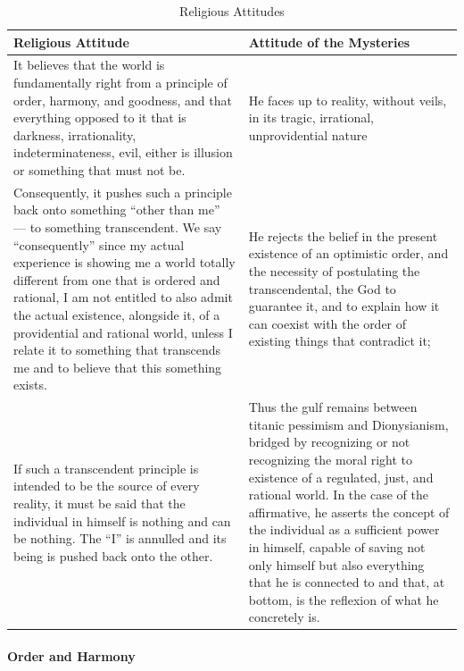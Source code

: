 \begin{table}[h]\small\centering
\begin{tabular}{p{}p{}}\toprule
Religious Attitude & Attitude of the Mysteries \\\midrule

It believes that the world is fundamentally right from a principle of order, harmony, and goodness, and that everything opposed to it that is darkness, irrationality, indeterminateness, evil, either is illusion or something that must not be. & He faces up to reality, without veils, in its tragic, irrational, unprovidential nature \\\midrule

Consequently, it pushes such a principle back onto something ``other than me'' --- to something transcendent. We say ``consequently'' since my actual experience is showing me a world totally different from one that is ordered and rational, I am not entitled to also admit the actual existence, alongside it, of a providential and rational world, unless I relate it to something that transcends me and to believe that this something exists. & He rejects the belief in the present existence of an optimistic order, and the necessity of postulating the transcendental, the God to guarantee it, and to explain how it can coexist with the order of existing things that contradict it; \\\midrule 

If such a transcendent principle is intended to be the source of every reality, it must be said that the individual in himself is nothing and can be nothing. The ``I'' is annulled and its being is pushed back onto the other. & Thus the gulf remains between titanic pessimism and Dionysianism, bridged by recognizing or not recognizing the moral right to existence of a regulated, just, and rational world. In the case of the affirmative, he asserts the concept of the individual as a sufficient power in himself, capable of saving not only himself but also everything that he is connected to and that, at bottom, is the reflexion of what he concretely is. \\\bottomrule
\end{tabular}
\label{tab:ReligiousAttitudes}
\caption{Religious Attitudes}
\end{table}

\paragraph{Order and Harmony}


